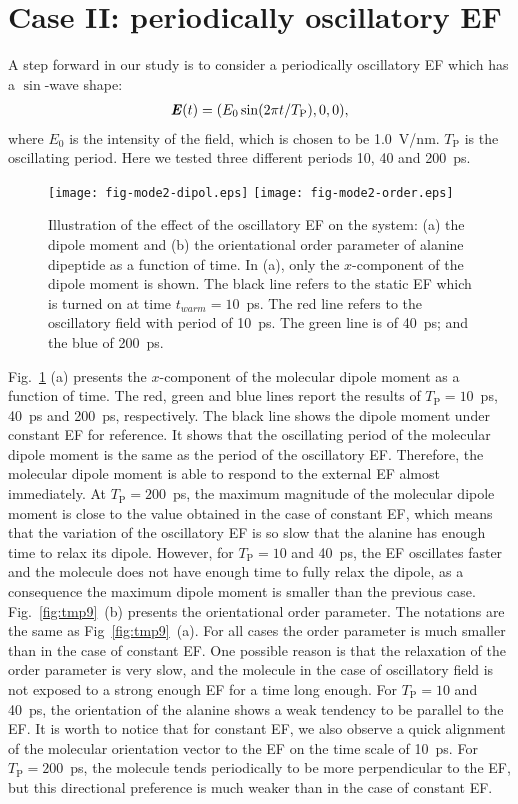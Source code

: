 \documentclass[a4paper,preprint,unsortedaddress,onecolumn]{revtex4-1}
\newcommand{\vect}[1]{\textbf{\textit{#1}}}
\newcommand{\period}[0]{T_{\textrm{P}}}
\begin{document}
\section{Case II:
  periodically oscillatory EF}
A step forward in our study is to consider a periodically oscillatory EF which has
a $\sin$-wave shape:
\begin{align}
  \vect E(t) = (E_0\sin(2\pi t / \period), 0, 0),
\end{align}
where $E_0$ is the intensity of the field, which is chosen to be
1.0~V/nm.  $\period$ is the oscillating period.
Here we tested three different
periods 10, 40 and 200~ps.
\begin{figure}
  \centering
  \texttt{[image: fig-mode2-dipol.eps]}
  \texttt{[image: fig-mode2-order.eps]}
  \caption{Illustration of the effect of the oscillatory EF on the system:
    (a) the dipole moment  and (b) the
    orientational order parameter of alanine dipeptide as a
    function of time. In (a),
    only the $x$-component of the dipole moment is
    shown. The black line refers to the static EF which is turned on
    at time $t_{warm} = 10$~ps. The red line refers to the oscillatory field with period of
    10~ps. The green line is of 40~ps; and the blue of 200~ps.}
  \label{fig:tmp8}
\end{figure}
Fig.~\ref{fig:tmp8} (a)
presents the $x$-component of the molecular dipole moment as
a function of time. The red, green and blue lines report the
results of $\period =10$~ps, 40~ps and 200~ps, respectively. The black line
shows the dipole moment under constant EF
for reference.
It shows that the oscillating period of the molecular dipole moment
is the same as the period of the oscillatory EF. Therefore,
the molecular dipole moment
is able to respond to the external EF almost immediately.
At $\period =200$~ps, the maximum magnitude of the molecular
dipole moment is close to the value obtained in the case of constant EF, which
means that the variation of the oscillatory EF is so slow that the
alanine has enough time to 
relax its dipole. However,
for $\period =10$ and 40~ps, the EF oscillates faster and the molecule 
does not have enough time to fully relax the dipole, as a consequence the maximum dipole moment is smaller than the previous case.
Fig.~\ref{fig:tmp9}~(b) presents the orientational order
parameter. The notations are the same as Fig~\ref{fig:tmp9}~(a).
For all cases the order parameter is much
smaller than in the case of constant EF. One possible reason is that the
relaxation of the order parameter is very slow, and the molecule in the case of oscillatory field is
not exposed to a strong enough EF for a time long enough.
For  $\period =10$ and 40~ps, the orientation of the alanine shows a weak tendency
to be parallel to the EF. It is worth to notice that for constant EF,
we also observe a quick alignment of the molecular orientation vector to the EF
on the time scale of 10~ps. For $\period =200$~ps, the molecule tends periodically
to be more perpendicular to the EF, but this directional preference is much
weaker than in the case of constant EF.
\end{document}
